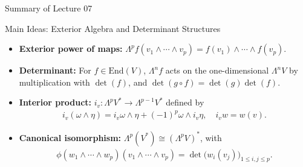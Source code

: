 \begin{frame}{Summary of Lecture 07}
\begin{block}{Main Ideas: Exterior Algebra and Determinant Structures}
\begin{itemize}
  \item \textbf{Exterior power of maps:} $\Lambda^{p}f(v_1\wedge\cdots\wedge v_p)=f(v_1)\wedge\cdots\wedge f(v_p)$.
  \item \textbf{Determinant:} For $f\in\mathrm{End}(V)$, $\Lambda^{n}f$ acts on the one-dimensional $\Lambda^{n}V$ by multiplication with $\det(f)$, and $\det(g\circ f)=\det(g)\det(f)$.
  \item \textbf{Interior product:} $i_v:\Lambda^{p}V^*\to\Lambda^{p-1}V^*$ defined by
  \begin{align*}
  i_v(\omega\wedge\eta)=i_v\omega\wedge\eta+(-1)^{p}\omega\wedge i_v\eta,\quad i_vw=w(v).
  \end{align*}
  \item \textbf{Canonical isomorphism:} $\Lambda^{p}(V^*)\cong(\Lambda^{p}V)^*$, with
  \begin{align*}
  \phi(w_1\wedge\cdots\wedge w_p)(v_1\wedge\cdots\wedge v_p)=
  \det\!\big(w_i(v_j)\big)_{1\le i,j\le p}.
  \end{align*}
\end{itemize}
\end{block}
\end{frame}

